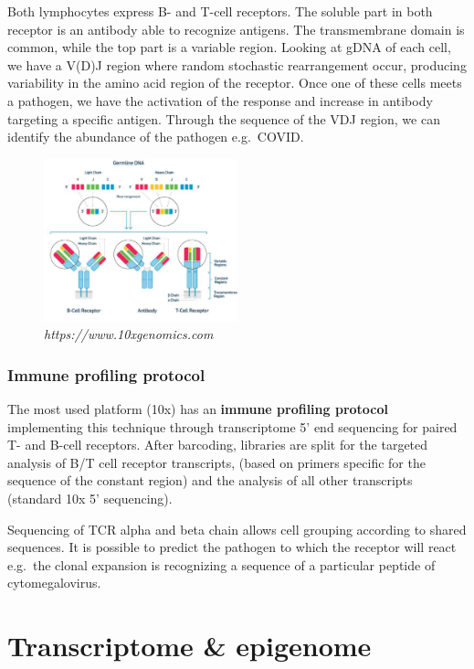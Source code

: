 Both lymphocytes express B- and T-cell receptors. The soluble part in
both receptor is an antibody able to recognize antigens. The
transmembrane domain is common, while the top part is a variable region.
Looking at gDNA of each cell, we have a V(D)J region where random
stochastic rearrangement occur, producing variability in the amino acid
region of the receptor. Once one of these cells meets a pathogen, we
have the activation of the response and increase in antibody targeting a
specific antigen. Through the sequence of the VDJ region, we can
identify the abundance of the pathogen e.g.~COVID.

\begin{figure}
\centering
\includegraphics[width=0.5\textwidth]{images/Screenshot_5.png}
\caption{\emph{https://www.10xgenomics.com}}
\end{figure}


\hypertarget{immune-profiling-protocol}{%
\subsubsection{Immune profiling
protocol}\label{immune-profiling-protocol}}

The most used platform (10x) has an \textbf{immune profiling protocol}
implementing this technique through transcriptome 5' end sequencing for
paired T- and B-cell receptors. After barcoding, libraries are split for
the targeted analysis of B/T cell receptor transcripts, (based on
primers specific for the sequence of the constant region) and the
analysis of all other transcripts (standard 10x 5' sequencing).

Sequencing of TCR alpha and beta chain allows cell grouping according to
shared sequences. It is possible to predict the pathogen to which the
receptor will react e.g.~the clonal expansion is recognizing a sequence
of a particular peptide of cytomegalovirus.

\hypertarget{transcriptome-epigenome}{%
\section{Transcriptome \& epigenome}\label{transcriptome-epigenome}}

